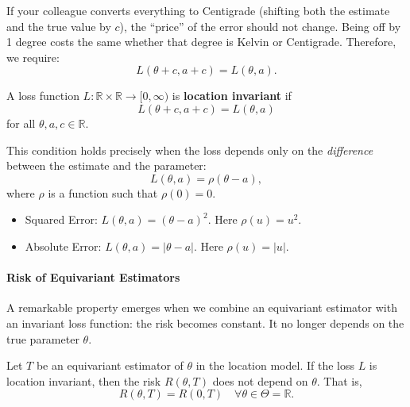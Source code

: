 If your colleague converts everything to Centigrade (shifting both the estimate and the true value by \(c\)), the ``price'' of the error should not change. Being off by 1 degree costs the same whether that degree is Kelvin or Centigrade. Therefore, we require:
\[ L(\theta + c, a + c) = L(\theta, a). \]

\begin{definition}
A loss function \(L: \mathbb{R} \times \mathbb{R} \to [0, \infty)\) is \textbf{location invariant} if
\[
L(\theta + c, a + c) = L(\theta, a)
\]
for all \(\theta, a, c \in \mathbb{R}\).

This condition holds precisely when the loss depends only on the \textit{difference} between the estimate and the parameter:
\[ L(\theta, a) = \rho(\theta - a), \]
where \(\rho\) is a function such that \(\rho(0) = 0\).
\end{definition}

\begin{ex}
\leavevmode
\begin{itemize}
    \item Squared Error: \(L(\theta, a) = (\theta - a)^2\). Here \(\rho(u) = u^2\).
    \item Absolute Error: \(L(\theta, a) = |\theta - a|\). Here \(\rho(u) = |u|\).
\end{itemize}
\end{ex}

\paragraph{Risk of Equivariant Estimators}

A remarkable property emerges when we combine an equivariant estimator with an invariant loss function: the risk becomes constant. It no longer depends on the true parameter \(\theta\).

\begin{lemma}
\label{lemma:constant_risk}
Let \(T\) be an equivariant estimator of \(\theta\) in the location model. If the loss \(L\) is location invariant, then the risk \(R(\theta, T)\) does not depend on \(\theta\). That is,
\[
R(\theta, T) = R(0, T) \quad \forall \theta \in \Theta = \mathbb{R}.
\]
\end{lemma}


